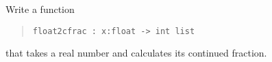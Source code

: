 Write a function
\begin{quote}
  \lstinline{float2cfrac : x:float -> int list}
\end{quote}
that takes a real number and calculates its continued fraction.
